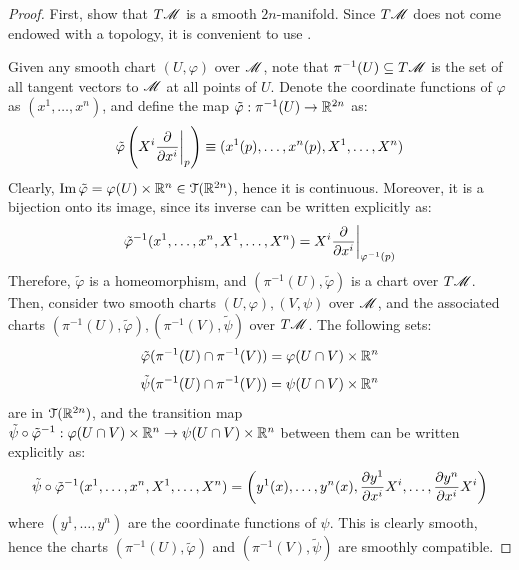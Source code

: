 \begin{proofbox}
  \begin{proof}
    First, show that $ T\mathscr{M} $ is a smooth $ 2n $-manifold. Since $ T\mathscr{M} $ does not come endowed with a topology, it is convenient to use .

    Given any smooth chart $ (U , \varphi) $ over $ \mathscr{M} $, note that $ \pi^{-1}(U) \subseteq T\mathscr{M} $ is the set of all tangent vectors to $ \mathscr{M} $ at all points of $ U $. Denote the coordinate functions of $ \varphi $ as $ (x^1 , \dots , x^n) $, and define the map $ \tilde{\varphi} : \pi^{-1}(U) \rightarrow \mathbb{R}^{2n} $ as:
    \begin{equation*}
      \tilde{\varphi} \left( X^i \frac{\partial}{\partial x^i} \bigg\vert_p \right) \equiv (x^1(p) , \dots , x^n(p) , X^1 , \dots , X^n)
    \end{equation*}
    Clearly, $ \operatorname{Im} \tilde{\varphi} = \varphi(U) \times \mathbb{R}^n \in \EuScript{T}(\mathbb{R}^{2n}) $, hence it is continuous. Moreover, it is a bijection onto its image, since its inverse can be written explicitly as:
    \begin{equation*}
      \tilde{\varphi}^{-1}(x^1 , \dots , x^n , X^1 , \dots , X^n) = X^i \frac{\partial}{\partial x^i} \bigg\vert_{\varphi^{-1}(p)}
    \end{equation*}
    Therefore, $ \tilde{\varphi} $ is a homeomorphism, and $ (\pi^{-1}(U) , \tilde{\varphi}) $ is a chart over $ T\mathscr{M} $. Then, consider two smooth charts $ (U , \varphi) , (V , \psi) $ over $ \mathscr{M} $, and the associated charts $ (\pi^{-1}(U) , \tilde{\varphi}) , (\pi^{-1}(V) , \tilde{\psi}) $ over $ T\mathscr{M} $. The following sets:
    \begin{equation*}
      \tilde{\varphi}(\pi^{-1}(U) \cap \pi^{-1}(V)) = \varphi(U \cap V) \times \mathbb{R}^n
    \end{equation*}
    \begin{equation*}
      \tilde{\psi}(\pi^{-1}(U) \cap \pi^{-1}(V)) = \psi(U \cap V) \times \mathbb{R}^n
    \end{equation*}
    are in $ \EuScript{T}(\mathbb{R}^{2n}) $, and the transition map $ \tilde{\psi} \circ \tilde{\varphi}^{-1} : \varphi(U \cap V) \times \mathbb{R}^n \rightarrow \psi(U \cap V) \times \mathbb{R}^n $ between them can be written explicitly as:
    \begin{equation*}
      \tilde{\psi} \circ \tilde{\varphi}^{-1} (x^1 , \dots , x^n , X^1 , \dots , X^n) = \left( y^1(x) , \dots , y^n(x) , \frac{\partial y^1}{\partial x^i} X^i , \dots , \frac{\partial y^n}{\partial x^i} X^i \right)
    \end{equation*}
    where $ (y^1 , \dots , y^n) $ are the coordinate functions of $ \psi $. This is clearly smooth, hence the charts $ (\pi^{-1}(U) , \tilde{\varphi}) $ and $ (\pi^{-1}(V) , \tilde{\psi}) $ are smoothly compatible.


\end{proof}
\end{proofbox}
